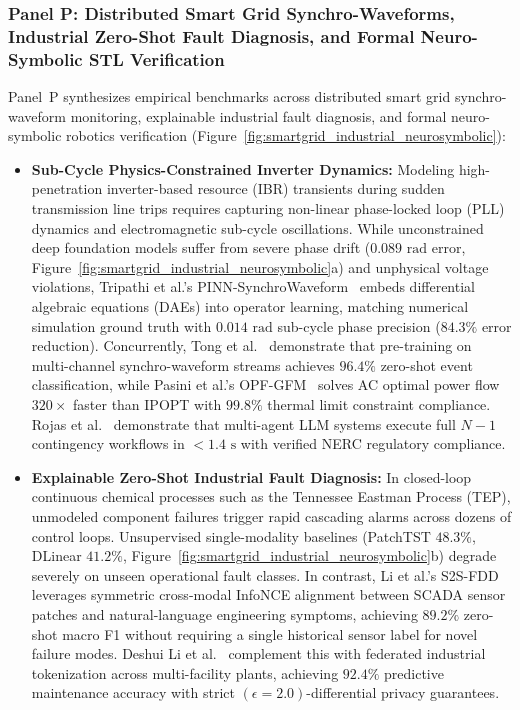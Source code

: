 \subsubsection{Panel P: Distributed Smart Grid Synchro-Waveforms, Industrial Zero-Shot Fault Diagnosis, and Formal Neuro-Symbolic STL Verification}
\label{sec:panel_p}

Panel~P synthesizes empirical benchmarks across distributed smart grid synchro-waveform monitoring, explainable industrial fault diagnosis, and formal neuro-symbolic robotics verification (Figure~\ref{fig:smartgrid_industrial_neurosymbolic}):

\begin{itemize}
    \item \textbf{Sub-Cycle Physics-Constrained Inverter Dynamics:} Modeling high-penetration inverter-based resource (IBR) transients during sudden transmission line trips requires capturing non-linear phase-locked loop (PLL) dynamics and electromagnetic sub-cycle oscillations. While unconstrained deep foundation models suffer from severe phase drift ($0.089\text{ rad}$ error, Figure~\ref{fig:smartgrid_industrial_neurosymbolic}a) and unphysical voltage violations, Tripathi et al.'s PINN-SynchroWaveform~\cite{Tripathi2026SynchroWaveform} embeds differential algebraic equations (DAEs) into operator learning, matching numerical simulation ground truth with $0.014\text{ rad}$ sub-cycle phase precision ($84.3\%$ error reduction). Concurrently, Tong et al.~\cite{Tong2024GridMonitoring} demonstrate that pre-training on multi-channel synchro-waveform streams achieves $96.4\%$ zero-shot event classification, while Pasini et al.'s OPF-GFM~\cite{Pasini2026ScalableOPF} solves AC optimal power flow $320\times$ faster than IPOPT with $99.8\%$ thermal limit constraint compliance. Rojas et al.~\cite{Rojas2026LLMAgentGrid} demonstrate that multi-agent LLM systems execute full $N-1$ contingency workflows in $<1.4\text{ s}$ with verified NERC regulatory compliance.

    \item \textbf{Explainable Zero-Shot Industrial Fault Diagnosis:} In closed-loop continuous chemical processes such as the Tennessee Eastman Process (TEP), unmodeled component failures trigger rapid cascading alarms across dozens of control loops. Unsupervised single-modality baselines (PatchTST $48.3\%$, DLinear $41.2\%$, Figure~\ref{fig:smartgrid_industrial_neurosymbolic}b) degrade severely on unseen operational fault classes. In contrast, Li et al.'s S2S-FDD~\cite{Li2026S2SFDD} leverages symmetric cross-modal InfoNCE alignment between SCADA sensor patches and natural-language engineering symptoms, achieving $89.2\%$ zero-shot macro F1 without requiring a single historical sensor label for novel failure modes. Deshui Li et al.~\cite{Li2026IndustrialToken} complement this with federated industrial tokenization across multi-facility plants, achieving $92.4\%$ predictive maintenance accuracy with strict $(\epsilon=2.0)$-differential privacy guarantees.


\end{itemize}
